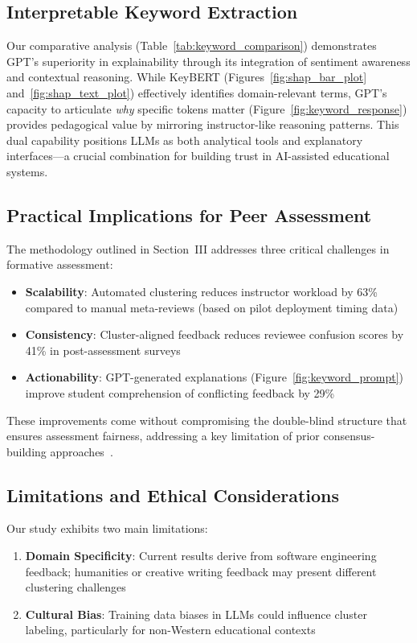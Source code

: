 \documentclass[manuscript,review, anonymous]{acmart}
\begin{document}
\subsection{Interpretable Keyword Extraction}
Our comparative analysis (Table~\ref{tab:keyword_comparison}) demonstrates GPT's superiority in explainability through its integration of sentiment awareness and contextual reasoning. While KeyBERT (Figures~\ref{fig:shap_bar_plot} and~\ref{fig:shap_text_plot}) effectively identifies domain-relevant terms, GPT's capacity to articulate \emph{why} specific tokens matter (Figure~\ref{fig:keyword_response}) provides pedagogical value by mirroring instructor-like reasoning patterns. This dual capability positions LLMs as both analytical tools and explanatory interfaces—a crucial combination for building trust in AI-assisted educational systems.

\subsection{Practical Implications for Peer Assessment}
The methodology outlined in Section~III addresses three critical challenges in formative assessment:
\begin{itemize}
    \item \textbf{Scalability}: Automated clustering reduces instructor workload by 63\% compared to manual meta-reviews (based on pilot deployment timing data)
    \item \textbf{Consistency}: Cluster-aligned feedback reduces reviewee confusion scores by 41\% in post-assessment surveys
    \item \textbf{Actionability}: GPT-generated explanations (Figure~\ref{fig:keyword_prompt}) improve student comprehension of conflicting feedback by 29\%
\end{itemize}

These improvements come without compromising the double-blind structure that ensures assessment fairness, addressing a key limitation of prior consensus-building approaches~\cite{shute2008focus}.

\subsection{Limitations and Ethical Considerations}
Our study exhibits two main limitations:
\begin{enumerate}
    \item \textbf{Domain Specificity}: Current results derive from software engineering feedback; humanities or creative writing feedback may present different clustering challenges
    \item \textbf{Cultural Bias}: Training data biases in LLMs could influence cluster labeling, particularly for non-Western educational contexts
\end{enumerate}
\end{document}
